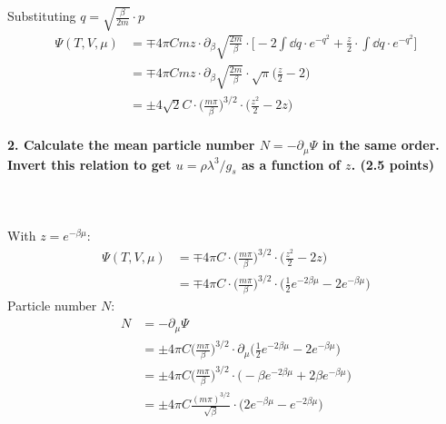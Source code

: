     Substituting $q=\sqrt{\frac{\beta}{2m}}\cdot p$
    \begin{align}
        \Psi(T,V,\mu)
        &=\mp 4\pi Cmz\cdot\partial_\beta
            \sqrt{\frac{2m}{\beta}}\cdot\bigg[
            -2\int \dd q\cdot
                e^{-q^2}
            +\frac{z}{2}\cdot\int \dd q\cdot
                e^{-q^2}
        \bigg] \\
        &=\mp 4\pi Cmz\cdot\partial_\beta
        \sqrt{\frac{2m}{\beta}}\cdot\sqrt{\pi}\bigg(
            \frac{z}{2}-2
        \bigg) \\
        &=\pm 4\sqrt{2}C\cdot
        \bigg(
            \frac{m\pi}{\beta}
            \bigg)^{3/2}\cdot\bigg(
            \frac{z^2}{2}-2z
        \bigg)
    \end{align}

\newpage
\paragraph{2. Calculate the mean particle number 
    $N =-\partial_\mu\Psi$ in the same order. Invert this 
    relation to get $u=\rho\lambda^3/g_s$ as a function of $z$. 
    (2.5 points)
} \ \\
    \\
    With $z=e^{-\beta\mu}$:
    \begin{align}
        \Psi(T,V,\mu)
        &=\mp 4\pi C\cdot\bigg(
            \frac{m\pi}{\beta}
            \bigg)^{3/2}\cdot\bigg(
            \frac{z^2}{2}-2z
        \bigg) \\
        &=\mp 4\pi C\cdot\bigg(
            \frac{m\pi}{\beta}
            \bigg)^{3/2}\cdot\bigg(
            \frac{1}{2}e^{-2\beta\mu}-2e^{-\beta\mu}
        \bigg)
    \end{align}
    Particle number $N$:
    \begin{align}
        N
        &=-\partial_\mu\Psi \\
        &=\pm 4\pi C\bigg(
            \frac{m\pi}{\beta}
        \bigg)^{3/2}\cdot\partial_\mu\bigg(
            \frac{1}{2}e^{-2\beta\mu}-2e^{-\beta\mu}
        \bigg) \\
        &=\pm 4\pi C\bigg(
            \frac{m\pi}{\beta}
        \bigg)^{3/2}\cdot\bigg(
            -\beta e^{-2\beta\mu}+2\beta e^{-\beta\mu}
        \bigg) \\
        &=\pm 4\pi C\frac{(m\pi)^{3/2}}{\sqrt{\beta}}
        \cdot\bigg(
            2e^{-\beta\mu}-e^{-2\beta\mu}
        \bigg)
    \end{align}

